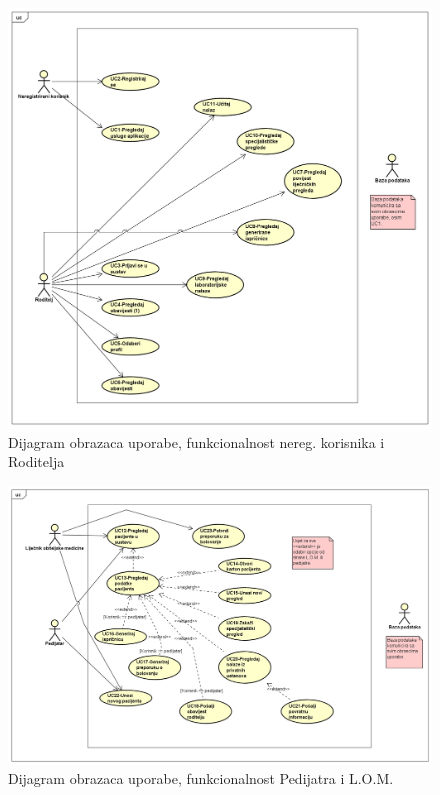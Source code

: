 					\begin{figure}[H]
						\includegraphics[scale=0.4]{dijagrami/usecase1.PNG} %
						\centering
						\caption{Dijagram obrazaca uporabe, funkcionalnost nereg. korisnika i Roditelja}
						\label{fig:useacase1}
					\end{figure}
					
					\begin{figure}[H]
						\includegraphics[scale=0.4]{dijagrami/usecase2.PNG} %
						\centering
						\caption{Dijagram obrazaca uporabe, funkcionalnost Pedijatra i L.O.M.}
						\label{fig:usecase2}
					\end{figure}
					
